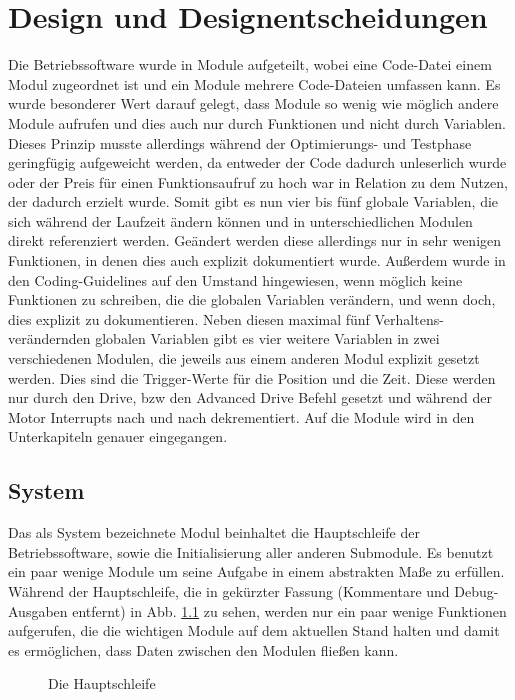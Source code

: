 \chapter{Design und Designentscheidungen}
Die Betriebssoftware wurde in Module aufgeteilt, wobei eine Code-Datei einem
Modul zugeordnet ist und ein Module mehrere Code-Dateien umfassen kann.
Es wurde besonderer Wert darauf gelegt, dass Module so wenig wie möglich andere
Module aufrufen und dies auch nur durch Funktionen und nicht durch Variablen.
Dieses Prinzip musste allerdings während der Optimierungs- und Testphase
geringfügig aufgeweicht werden, da entweder der Code dadurch unleserlich wurde
oder der Preis für einen Funktionsaufruf zu hoch war in Relation zu dem
Nutzen, der dadurch erzielt wurde.
Somit gibt es nun vier bis fünf globale Variablen, die sich während der Laufzeit
ändern können und in unterschiedlichen Modulen direkt referenziert werden.
Geändert werden diese allerdings nur in sehr wenigen Funktionen, in denen dies
auch explizit dokumentiert wurde. Außerdem wurde in den Coding-Guidelines
auf den Umstand hingewiesen, wenn möglich keine Funktionen zu schreiben, die die
globalen Variablen verändern, und wenn doch, dies explizit zu dokumentieren.
Neben diesen maximal fünf Verhaltens-verändernden globalen Variablen gibt es vier
weitere Variablen in zwei verschiedenen Modulen, die jeweils aus einem anderen
Modul explizit gesetzt werden. Dies sind die Trigger-Werte für die Position und
die Zeit. Diese werden nur durch den Drive, bzw den Advanced Drive Befehl
gesetzt und während der Motor Interrupts nach und nach dekrementiert.
Auf die Module wird in den Unterkapiteln genauer eingegangen.
\section{System}
Das als System bezeichnete Modul beinhaltet die Hauptschleife der Betriebssoftware,
sowie die Initialisierung aller anderen Submodule. Es benutzt ein paar wenige Module
um seine Aufgabe in einem abstrakten Maße zu erfüllen. Während der Hauptschleife, die
in gekürzter Fassung (Kommentare und Debug-Ausgaben entfernt) in Abb. \ref{main_loop} zu sehen,
werden nur ein paar wenige Funktionen aufgerufen, die die wichtigen Module auf dem
aktuellen Stand halten und damit es ermöglichen, dass Daten zwischen den Modulen
fließen kann.
\begin{figure}[htb]
 \centering
 \caption{\label{main_loop}Die Hauptschleife}
\end{figure}
